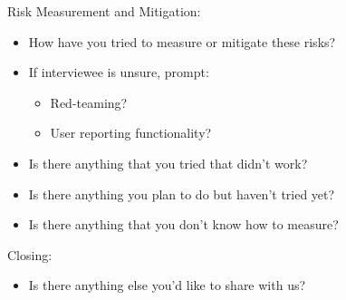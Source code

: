 Risk Measurement and Mitigation: 
\begin{itemize}
    \item How have you tried to measure or mitigate these risks? 
    \item If interviewee is unsure, prompt: 
    \begin{itemize}
        \item Red-teaming?
        \item User reporting functionality? 
    \end{itemize}
    \item Is there anything that you tried that didn’t work?
    \item Is there anything you plan to do but haven’t tried yet? 
    \item Is there anything that you don’t know how to measure? 
\end{itemize}

Closing:
\begin{itemize}
    \item Is there anything else you’d like to share with us?
\end{itemize}

